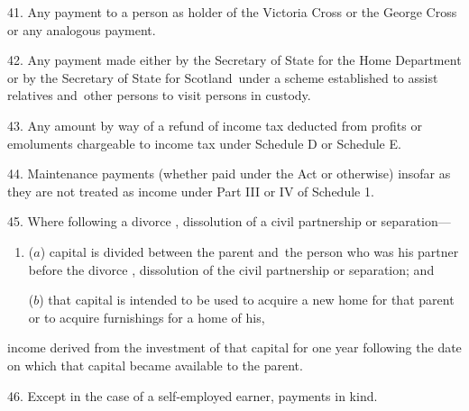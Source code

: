 \documentclass[12pt,a4paper]{article}
\begin{document}
41.  Any payment to a person as holder of the Victoria Cross or the George Cross or any analogous payment.

\medskip

42.  Any payment made either by the Secretary of State for the Home Department or by the Secretary of State for Scotland~under a scheme established to assist relatives and~other persons to visit persons in custody.

\medskip

43.  Any amount by way of a refund of income tax deducted from profits or emoluments chargeable to income tax under Schedule D or Schedule E.

\medskip

44.  Maintenance payments (whether paid under the Act or otherwise) insofar as they are not treated as income under Part III or IV
of Schedule 1.  %


\medskip

45.  Where following a divorce%
, dissolution of a civil partnership  %
or separation—
\begin{enumerate}\item[]
($a$) capital is divided between the parent and~the person who was his partner before the divorce%
, dissolution of the civil partnership  %
or separation; and

($b$) that capital is intended to be used to acquire a new home for that parent or to acquire furnishings for a home of his,
\end{enumerate}
income derived from the investment of that capital for one year following the date on which that capital became available to the parent.


\medskip

46.  Except in the case of a self-employed earner, payments in kind.

\end{document}
